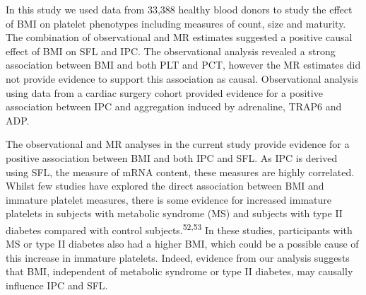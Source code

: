 \documentclass[11pt,twoside]{bristolthesis}
\begin{document}
In this study we used data from 33,388 healthy blood donors to study the effect of BMI on platelet phenotypes including measures of count, size and maturity. The combination of observational and MR estimates suggested a positive causal effect of BMI on SFL and IPC. The observational analysis revealed a strong association between BMI and both PLT and PCT, however the MR estimates did not provide evidence to support this association as causal. Observational analysis using data from a cardiac surgery cohort provided evidence for a positive association between IPC and aggregation induced by adrenaline, TRAP6 and ADP.

The observational and MR analyses in the current study provide evidence for a positive association between BMI and both IPC and SFL. As IPC is derived using SFL, the measure of mRNA content, these measures are highly correlated. Whilst few studies have explored the direct association between BMI and immature platelet measures, there is some evidence for increased immature platelets in subjects with metabolic syndrome (MS) and subjects with type II diabetes compared with control subjects.\textsuperscript{52,53} In these studies, participants with MS or type II diabetes also had a higher BMI, which could be a possible cause of this increase in immature platelets. Indeed, evidence from our analysis suggests that BMI, independent of metabolic syndrome or type II diabetes, may causally influence IPC and SFL.
\end{document}
